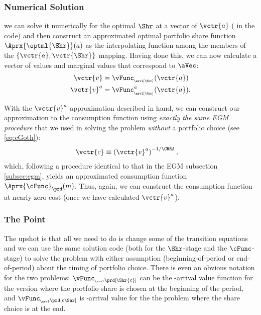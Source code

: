 \documentclass[SolvingMicroDSOPs]{subfiles}
\begin{document}
\subsubsection{Numerical Solution}
we can solve it numerically for the optimal $\Shr$ at a vector of $\vctr{a}$ ({\aVecCode} in the code)  and then construct an approximated optimal portfolio share function $\Aprx{\optml{\Shr}}(a)$ as the interpolating function among the members of the $\{\vctr{a},\vctr{\Shr}\}$ mapping.  Having done this, we can now calculate a vector of values and marginal values that correspond to $\aVec$:
\begin{equation}\begin{gathered}\begin{aligned}
      \vctr{v}  & = \vFunc_{_\arvl[\Shr]}(\vctr{a}) \label{eq:vShrEnd}
\\      \vctr{v}^\aNrm  & = \vFunc^{\aNrm}_{_\arvl[\Shr]}(\vctr{a}).
    \end{aligned}\end{gathered}\end{equation}

With the $\vctr{v}^{\aNrm}$ approximation described in hand, we can construct our approximation to the consumption function using \emph{exactly the same EGM procedure} that we used in solving the problem \emph{without} a portfolio choice (see \eqref{eq:cGoth}):
\begin{equation}\begin{gathered}\begin{aligned}
      \vctr{c}  & \equiv  \left(\vctr{\vNrm}^{\aNrm}\right)^{-1/\CRRA} \label{eq:cVecPort},
    \end{aligned}\end{gathered}\end{equation}
which, following a procedure identical to that in the EGM subsection \ref{subsec:egm}, yields an approximated consumption function $\Aprx{\cFunc}_{\prd}(m)$.  Thus, again, we can construct the consumption function at nearly zero cost (once we have calculated $\vctr{v}^{a}$).

\hypertarget{the-point}{}

\subsubsection{The Point}\label{subsubsec:the-point}

The upshot is that all we need to do is change some of the transition equations and we can use the same solution code (both for the $\Shr$-stage and the $\cFunc$-stage) to solve the problem with either assumption (beginning-of-period or end-of-period) about the timing of portfolio choice.  There is even an obvious notation for the two problems: $\vFunc_{_\arvl\prd[\Shr{c}]}$ can be the {\interval}-arrival value function for the version where the portfolio share is chosen at the beginning of the period, and $\vFunc_{_\arvl\prd[{c}\Shr]}$ is {\interval}-arrival value for the the problem where the share choice is at the end.
\end{document}
